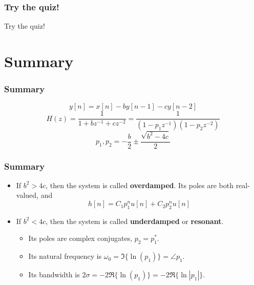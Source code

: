 \documentclass{beamer}
\begin{document}
\begin{frame}
  \frametitle{Try the quiz!}

  Try the quiz!
\end{frame}

\section[Summary]{Summary}
\setcounter{subsection}{1}

\begin{frame}
  \frametitle{Summary}

  \begin{displaymath}
    y[n] = x[n] -b y[n-1]-cy[n-2]
  \end{displaymath}
  \begin{displaymath}
    H(z) = \frac{1}{1+bz^{-1}+cz^{-2}} = \frac{1}{(1-p_1z^{-1})(1-p_2z^{-2})}
  \end{displaymath}
  \begin{displaymath}
    p_1,p_2 = -\frac{b}{2} \pm \frac{\sqrt{b^2-4c}}{2}
  \end{displaymath}
\end{frame}

\begin{frame}
  \frametitle{Summary}
  \begin{itemize}
  \item If $b^2>4c$, then the system is called {\bf overdamped}.  Its
    poles are both real-valued, and
    \begin{displaymath}
      h[n] = C_1p_1^n u[n] + C_2p_2^nu[n]
    \end{displaymath}
  \item If $b^2<4c$, then the system is called {\bf underdamped} or
    {\bf resonant}.
    \begin{itemize}
    \item Its poles are complex conjugates, $p_2=p_1^*$.
    \item Its natural frequency is $\omega_0=\Im\{\ln(p_1)\}=\angle p_1$.
    \item Its bandwidth is $2\sigma =-2\Re\{\ln(p_1)\}=-2\Re\{\ln|p_1|\}$.
    \end{itemize}
  \end{itemize}
\end{frame}
\end{document}
